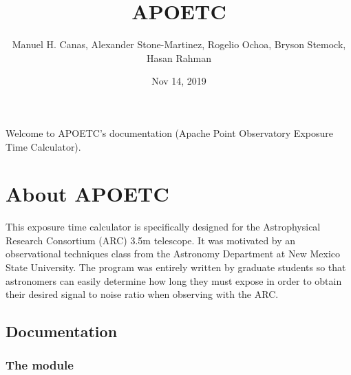 \documentclass[letterpaper,10pt,english]{sphinxmanual}
\title{APOETC}
\date{Nov 14, 2019}
\author{Manuel H.\@{} Canas, Alexander Stone-Martinez, Rogelio Ochoa, Bryson Stemock, Hasan Rahman}
\begin{document}
\pagestyle{empty}
\sphinxmaketitle
\pagestyle{plain}
\sphinxtableofcontents
\pagestyle{normal}
\label{\detokenize{index::doc}}


Welcome to APOETC’s documentation (Apache Point Observatory Exposure Time Calculator).


\chapter{About APOETC}
\label{\detokenize{index:about-apoetc}}
This exposure time calculator is specifically designed for the Astrophysical Research Consortium (ARC) 3.5m telescope. It was motivated by an observational techniques class from the Astronomy Department at New Mexico State University. The program was entirely written by graduate students so that astronomers can easily determine how long they must expose in order to obtain their desired signal to noise ratio when observing with the ARC.


\section{Documentation}
\label{\detokenize{modules:documentation}}\label{\detokenize{modules::doc}}

\subsection{The  module}
\label{\detokenize{modules:the-arc-module}}

\subsubsection{}
\label{\detokenize{modules:instrument}}
\end{document}
